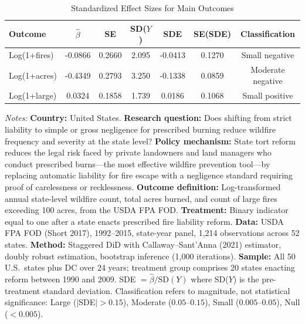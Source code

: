 \begin{table}[H]
\centering
\caption{Standardized Effect Sizes for Main Outcomes}
\label{tab:sde}
\begin{threeparttable}
\begin{tabular}{l cccccc}
\toprule
Outcome & $\hat{\beta}$ & SE & SD($Y$) & SDE & SE(SDE) & Classification \\
\midrule
Log(1+fires) & -0.0866 & 0.2660 & 2.095 & -0.0413 & 0.1270 & Small negative \\
Log(1+acres) & -0.4349 & 0.2793 & 3.250 & -0.1338 & 0.0859 & Moderate negative \\
Log(1+large) & 0.0324 & 0.1858 & 1.739 & 0.0186 & 0.1068 & Small positive \\
\bottomrule
\end{tabular}
\begin{tablenotes}[flushleft]
\footnotesize
\item \textit{Notes:} \textbf{Country:} United States.
\textbf{Research question:} Does shifting from strict liability to simple or gross negligence for prescribed burning reduce wildfire frequency and severity at the state level?
\textbf{Policy mechanism:} State tort reform reduces the legal risk faced by private landowners and land managers who conduct prescribed burns---the most effective wildfire prevention tool---by replacing automatic liability for fire escape with a negligence standard requiring proof of carelessness or recklessness.
\textbf{Outcome definition:} Log-transformed annual state-level wildfire count, total acres burned, and count of large fires exceeding 100 acres, from the USDA FPA FOD.
\textbf{Treatment:} Binary indicator equal to one after a state enacts prescribed fire liability reform.
\textbf{Data:} USDA FPA FOD (Short 2017), 1992--2015, state-year panel, 1,214 observations across 52 states.
\textbf{Method:} Staggered DiD with Callaway--Sant'Anna (2021) estimator, doubly robust estimation, bootstrap inference (1,000 iterations).
\textbf{Sample:} All 50 U.S.\ states plus DC over 24 years; treatment group comprises 20 states enacting reform between 1990 and 2009.
SDE $= \hat{\beta} / \text{SD}(Y)$ where SD($Y$) is the pre-treatment standard deviation.
Classification refers to magnitude, not statistical significance: Large ($|$SDE$| > 0.15$), Moderate ($0.05$--$0.15$), Small ($0.005$--$0.05$), Null ($< 0.005$).
\end{tablenotes}
\end{threeparttable}
\end{table}
